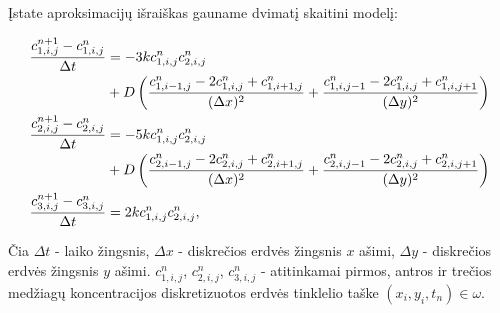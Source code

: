 Įstate aproksimacijų išraiškas gauname dvimatį skaitini modelį:

\begin{subequations} \label{numerical-eqs}
	\begin{align}
		\frac{c^{n+1}_{1,i,j}-c^n_{1,i,j}}{\Delta t} & =
		-3kc^{n}_{1,i,j}c^{n}_{2,i,j}\notag\\
        & +D\left(\frac{c^n_{1,i-1,j}-2c^n_{1,i,j}+c^n_{1,i+1,j}}{(\Delta x)^2}+\frac{c^n_{1,i,j-1}-2c^n_{1,i,j}+c^n_{1,i,j+1}}{(\Delta y)^2}\right) \\
		\frac{c^{n+1}_{2,i,j}-c^n_{2,i,j}}{\Delta t} & =
		-5kc^{n}_{1,i,j}c^{n}_{2,i,j}\notag\\
        &+D\left(\frac{c^n_{2,i-1,j}-2c^n_{2,i,j}+c^n_{2,i+1,j}}{(\Delta x)^2}+\frac{c^n_{2,i,j-1}-2c^n_{2,i,j}+c^n_{2,i,j+1}}{(\Delta y)^2}\right) \\
		\frac{c^{n+1}_{3,i,j}-c^n_{3,i,j}}{\Delta t} & =2kc^{n}_{1,i,j}c^{n}_{2,i,j},
	\end{align}
\end{subequations}

Čia
$\Delta t$ - laiko žingsnis,
$\Delta x$ - diskrečios erdvės žingsnis $x$ ašimi,
$\Delta y$ - diskrečios erdvės žingsnis $y$ ašimi.
$c^n_{1,i,j}$, $c^n_{2,i,j}$, $c^n_{3,i,j}$ - atitinkamai pirmos, antros ir trečios medžiagų koncentracijos diskretizuotos erdvės tinklelio taške $(x_i, y_i, t_n)\in\omega$.